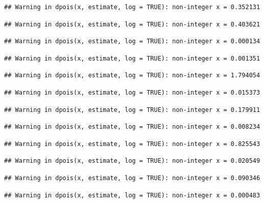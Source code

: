 \documentclass[]{article}
\begin{document}
\begin{verbatim}
## Warning in dpois(x, estimate, log = TRUE): non-integer x = 0.352131
\end{verbatim}

\begin{verbatim}
## Warning in dpois(x, estimate, log = TRUE): non-integer x = 0.403621
\end{verbatim}

\begin{verbatim}
## Warning in dpois(x, estimate, log = TRUE): non-integer x = 0.000134
\end{verbatim}

\begin{verbatim}
## Warning in dpois(x, estimate, log = TRUE): non-integer x = 0.001351
\end{verbatim}

\begin{verbatim}
## Warning in dpois(x, estimate, log = TRUE): non-integer x = 1.794054
\end{verbatim}

\begin{verbatim}
## Warning in dpois(x, estimate, log = TRUE): non-integer x = 0.015373
\end{verbatim}

\begin{verbatim}
## Warning in dpois(x, estimate, log = TRUE): non-integer x = 0.179911
\end{verbatim}

\begin{verbatim}
## Warning in dpois(x, estimate, log = TRUE): non-integer x = 0.008234
\end{verbatim}

\begin{verbatim}
## Warning in dpois(x, estimate, log = TRUE): non-integer x = 0.825543
\end{verbatim}

\begin{verbatim}
## Warning in dpois(x, estimate, log = TRUE): non-integer x = 0.020549
\end{verbatim}

\begin{verbatim}
## Warning in dpois(x, estimate, log = TRUE): non-integer x = 0.090346
\end{verbatim}

\begin{verbatim}
## Warning in dpois(x, estimate, log = TRUE): non-integer x = 0.000483
\end{verbatim}
\end{document}
